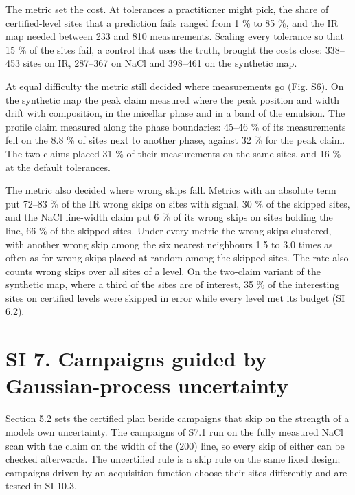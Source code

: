 \documentclass{iopjournal}
\begin{document}
The metric set the cost. At tolerances a practitioner might pick, the share of certified-level sites that a prediction fails ranged from 1 \% to 85 \%, and the IR map needed between 233 and 810 measurements. Scaling every tolerance so that 15 \% of the sites fail, a control that uses the truth, brought the costs close: 338--453 sites on IR, 287--367 on NaCl and 398--461 on the synthetic map.

At equal difficulty the metric still decided where measurements go (Fig. S6). On the synthetic map the peak claim measured where the peak position and width drift with composition, in the micellar phase and in a band of the emulsion. The profile claim measured along the phase boundaries: 45--46 \% of its measurements fell on the 8.8 \% of sites next to another phase, against 32 \% for the peak claim. The two claims placed 31 \% of their measurements on the same sites, and 16 \% at the default tolerances.

The metric also decided where wrong skips fall. Metrics with an absolute term put 72--83 \% of the IR wrong skips on sites with signal, 30 \% of the skipped sites, and the NaCl line-width claim put 6 \% of its wrong skips on sites holding the line, 66 \% of the skipped sites. Under every metric the wrong skips clustered, with another wrong skip among the six nearest neighbours 1.5 to 3.0 times as often as for wrong skips placed at random among the skipped sites. The rate also counts wrong skips over all sites of a level. On the two-claim variant of the synthetic map, where a third of the sites are of interest, 35 \% of the interesting sites on certified levels were skipped in error while every level met its budget (SI 6.2).

\hypertarget{si-7.-campaigns-guided-by-gaussian-process-uncertainty}{%
\section*{SI 7. Campaigns guided by Gaussian-process uncertainty}\label{si-7.-campaigns-guided-by-gaussian-process-uncertainty}}

Section 5.2 sets the certified plan beside campaigns that skip on the strength of a model\textquotesingle s own uncertainty. The campaigns of S7.1 run on the fully measured NaCl scan with the claim on the width of the (200) line, so every skip of either can be checked afterwards. The uncertified rule is a skip rule on the same fixed design; campaigns driven by an acquisition function choose their sites differently and are tested in SI 10.3.
\end{document}
